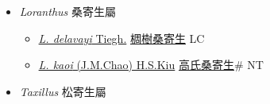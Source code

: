 
  \begin{itemize}
 \item[] \textit{Loranthus} 桑寄生屬
                    
  \begin{itemize}
        \item[] \href{http://www.theplantlist.org/tpl1.1/search?q=Loranthus+delavayi}{\textit{L. delavayi} Tiegh.}   \href{\detokenize{http://taibnet.sinica.edu.tw/chi/taibnet_species_list.php?T2=椆樹桑寄生&T2_new_value=true&fr=y}}{椆樹桑寄生} LC
        \item[] \href{http://www.theplantlist.org/tpl1.1/search?q=Loranthus+kaoi}{\textit{L. kaoi} (J.M.Chao) H.S.Kiu}   \href{\detokenize{http://taibnet.sinica.edu.tw/chi/taibnet_species_list.php?T2=高氏桑寄生&T2_new_value=true&fr=y}}{高氏桑寄生}\# NT
  \end{itemize}
 \item[] \textit{Taxillus} 松寄生屬
                    

\end{itemize}
